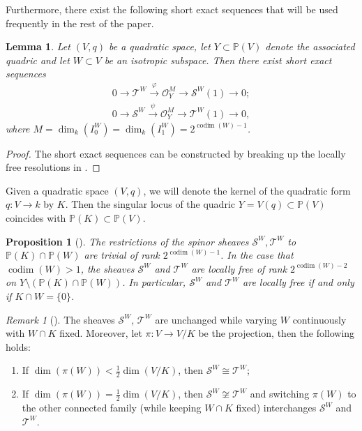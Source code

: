 \documentclass[a4paper, twoside, 11pt]{amsart}
\newtheorem{lemma}[theorem]{Lemma}
\newtheorem{proposition}[theorem]{Proposition}
\theoremstyle{definition}
\theoremstyle{remark}
\newtheorem{remark}[theorem]{Remark}
\numberwithin{equation}{theorem}
\DeclareMathOperator{\codim}{codim}
\begin{document}
Furthermore, there exist the following short exact sequences that will be used frequently in the rest of the paper. 
\begin{lemma}\label{exactsequences_spinors_o}
    Let $(V,q)$ be a quadratic space, let $Y \subset \mathbb{P}(V)$ denote the associated quadric and let $W \subset V$ be an isotropic subspace. Then there exist short exact sequences 
    \begin{equation}\label{ses_with_twist}
        \begin{aligned}
            0 \longrightarrow \mathcal{T}^W\overset{\varphi}{\longrightarrow} \mathcal{O}_Y^M \longrightarrow \mathcal{S}^W(1)\longrightarrow 0; \\
            0 \longrightarrow \mathcal{S}^W \overset{\psi}{\longrightarrow} \mathcal{O}_Y^M\longrightarrow \mathcal{T}^W(1) \longrightarrow 0,
        \end{aligned}
    \end{equation}
    where $M = \dim_k(I_0^W) = \dim_k(I_1^W) = 2^{\codim(W)-1}$.
\end{lemma}
\begin{proof}
    The short exact sequences can be constructed by breaking up the locally free resolutions in \cite[§4]{Addington}.
\end{proof}
Given a quadratic space $(V,q)$, we will denote the kernel of the quadratic form $q\colon V \to k$ by $K$. Then the singular locus of the quadric $Y =V(q) \subset \mathbb{P}(V)$ coincides with $\mathbb{P}(K) \subset \mathbb{P}(V)$.
\begin{proposition}[{\cite[Proposition 2.1]{Addington}}]\label{locallyfree_or_not}
    The restrictions of the spinor sheaves $\mathcal{S}^W,\mathcal{T}^W$ to $\mathbb{P}(K) \cap \mathbb{P}(W)$ are trivial of rank $2^{\codim(W)-1}$. In the case that $\codim(W) > 1$, the sheaves $\mathcal{S}^W$ and $\mathcal{T}^W$ are locally free of rank $2^{\codim(W)-2}$ on $Y\setminus (\mathbb{P}(K) \cap \mathbb{P}(W)) $. In particular, $\mathcal{S}^W$ and $\mathcal{T}^W$ are locally free if and only if $K\cap W =\{0\}$.
\end{proposition}
\begin{remark}[{\cite[§3]{Addington}}]
    The sheaves $\mathcal{S}^W$, $\mathcal{T}^W$ are unchanged while varying $W$ continuously with $W \cap K$ fixed. Moreover, let $\pi\colon V \to V/K$ be the projection, then the following holds:
    \begin{enumerate}[label=\roman*)]
        \item If $\dim(\pi(W)) < \frac{1}{2} \dim(V/K)$, then $\mathcal{S}^W \cong \mathcal{T}^W$;
        \item If $\dim(\pi(W)) = \frac{1}{2}\dim(V/K)$, then $\mathcal{S}^W \not\cong \mathcal{T}^W$ and switching $\pi(W)$ to the other connected family (while keeping $W\cap K$ fixed) interchanges $\mathcal{S}^W$ and $\mathcal{T}^W$. 
    \end{enumerate}
\end{remark}
\end{document}
